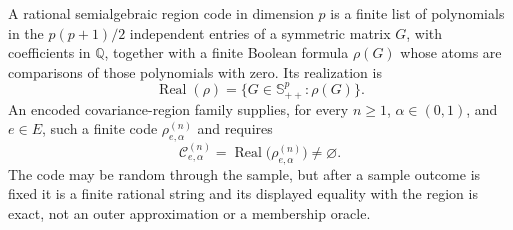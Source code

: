 A rational semialgebraic region code in dimension \(p\) is a finite list of polynomials in the \(p(p+1)/2\) independent entries of a symmetric matrix \(G\), with coefficients in \(\mathbb Q\), together with a finite Boolean formula \(\rho(G)\) whose atoms are comparisons of those polynomials with zero. Its realization is
\[
\operatorname{Real}(\rho)
=\{G\in\mathbb S_{++}^p:\rho(G)\}.
\]
An encoded covariance-region family supplies, for every \(n\geq1\), \(\alpha\in(0,1)\), and \(e\in E\), such a finite code \(\rho^{(n)}_{e,\alpha}\) and requires
\[
\mathcal C^{(n)}_{e,\alpha}
=\operatorname{Real}\bigl(\rho^{(n)}_{e,\alpha}\bigr)\neq\varnothing.
\]
The code may be random through the sample, but after a sample outcome is fixed it is a finite rational string and its displayed equality with the region is exact, not an outer approximation or a membership oracle.